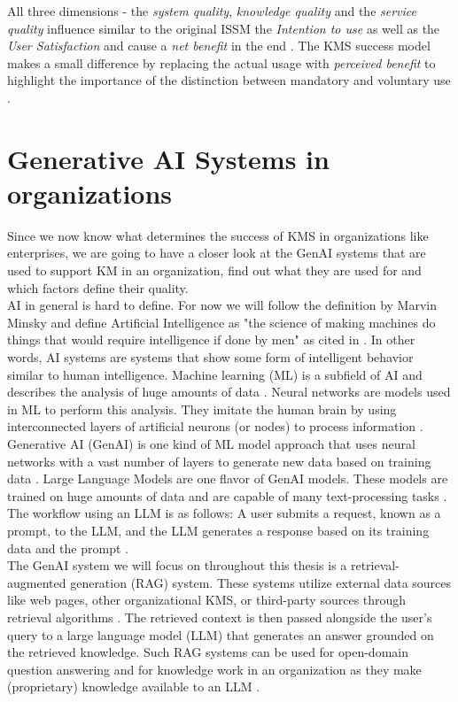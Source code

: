 \documentclass[
	english,
	ruledheaders=section,%
	class=report,%
	thesis={type=bachelor},%
	accentcolor=1b,%
	custommargins=true,%
	marginpar=false,%
	parskip=half-,%
	fontsize=11pt,%
	DIV=14,
]{tudapub}
\begin{document}
All three dimensions - the \textit{system quality}, \textit{knowledge quality} and the \textit{service quality} influence similar to the original ISSM the \textit{Intention to use} as well as the \textit{User Satisfaction} and cause a \textit{net benefit} in the end \parencite[p.~56]{Jennex2006}. The KMS success model makes a small difference by replacing the actual usage with \textit{perceived benefit} to highlight the importance of the distinction between mandatory and voluntary use \parencite[p.~55]{Jennex2006}.
\section{Generative AI Systems in organizations}
Since we now know what determines the success of KMS in organizations like enterprises, we are going to have a closer look at the GenAI systems that are used to support KM in an organization, find out what they are used for and which factors define their quality.\\
AI in general is hard to define. For now we will follow the definition by Marvin Minsky and define Artificial Intelligence as "the science of making machines do things that would require intelligence if done by men" \parencite{Minsky1966} as cited in \parencite{Dennis2025}. In other words, AI systems are systems that show some form of intelligent behavior similar to human intelligence. Machine learning (ML) is a subfield of AI and describes the analysis of huge amounts of data \parencite[p.~573]{Lund2023}. Neural networks are models used in ML to perform this analysis. They imitate the human brain by using interconnected layers of artificial neurons (or nodes) to process information \parencite[p.~573]{Lund2023}. Generative AI (GenAI) is one kind of ML model approach that uses neural networks with a vast number of layers to generate new data based on training data \parencite[p.~574]{Lund2023}.
Large Language Models are one flavor of GenAI models. These models are trained on huge amounts of data and are capable of many text-processing tasks \parencite[p.~2]{Naveed2024}. The workflow using an LLM is as follows: A user submits a request, known as a prompt, to the LLM, and the LLM generates a response based on its training data and the prompt \parencite[p.~575]{Lund2023}.\\
The GenAI system we will focus on throughout this thesis is a retrieval-augmented generation (RAG) system. These systems utilize external data sources like web pages, other organizational KMS, or third-party sources through retrieval algorithms \parencite{AWS_RAG}. The retrieved context is then passed alongside the user's query to a large language model (LLM) that generates an answer grounded on the retrieved knowledge. Such RAG systems can be used for open-domain question answering and for knowledge work in an organization as they make (proprietary) knowledge available to an LLM \parencite[p.~9459]{Lewis2020}.\\
\end{document}
